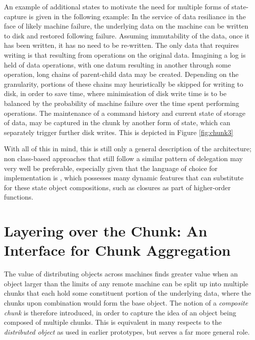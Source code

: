 \documentclass[10pt, a4paper]{article}
\begin{document}
An example of additional states to motivate the need for multiple forms of state-capture is given in the following example:
In the service of data resiliance in the face of likely machine failure, the underlying data on the machine can be written to disk and restored following failure.
Assuming immutability of the data, once it has been written, it has no need to be re-written.
The only data that requires writing is that resulting from operations on the original data.
Imagining a log is held of data operations, with one datum resulting in another through some operation, long chains of parent-child data may be created.
Depending on the granularity, portions of these chains may heuristically be skipped for writing to disk, in order to save time, where minimisation of disk write time is to be balanced by the probability of machine failure over the time spent performing operations.
The maintenance of a command history and current state of storage of data, may be captured in the chunk by another form of state, which can separately trigger further disk writes.
This is depicted in Figure \ref{fig:chunk3}


With all of this in mind, this is still only a general description of the architecture; non class-based approaches that still follow a similar pattern of delegation may very well be preferable, especially given that the language of choice for implementation is \R{}, which possesses many dynamic features that can substitute for these state object compositions, such as closures as part of higher-order functions.

\section{Layering over the Chunk: An Interface for Chunk Aggregation}

The value of distributing objects across machines finds greater value when an object larger than the limits of any remote machine can be split up into multiple chunks that each hold some constituent portion of the underlying data, where the chunks upon combination would form the base object.
The notion of a \textit{composite chunk} is therefore introduced, in order to capture the idea of an object being composed of multiple chunks.
This is equivalent in many respects to the \textit{distributed object} as used in earlier prototypes, but serves a far more general role.
\end{document}
